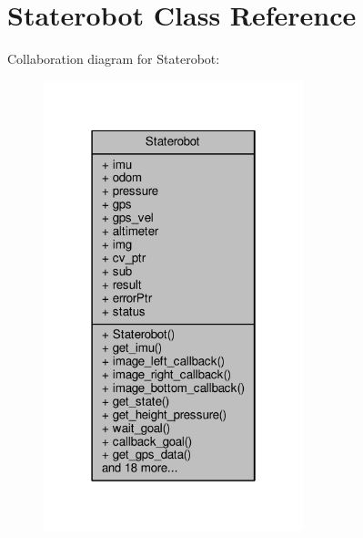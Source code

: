 \hypertarget{class_staterobot}{\section{Staterobot Class Reference}
\label{class_staterobot}
}


Collaboration diagram for Staterobot\-:
\nopagebreak
\begin{figure}[H]
\begin{center}
\leavevmode
\includegraphics[width=214pt]{class_staterobot__coll__graph}
\end{center}
\end{figure}
